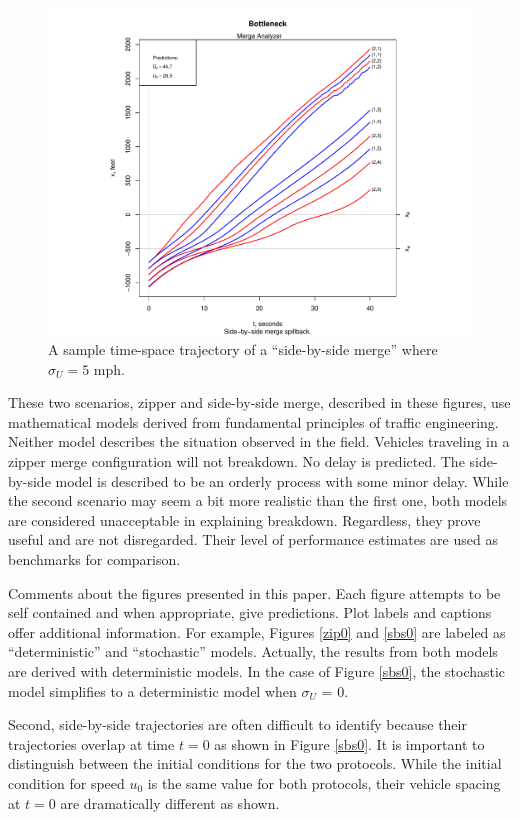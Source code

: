 \documentclass[Proceedings]{ascelike}
\begin{document}
\begin{figure}
\centering
\includegraphics[width = 5.5in]{Rplot12.pdf}
\caption{A sample time-space trajectory of a  ``side-by-side merge'' where  $\sigma_U = 5$ mph.}
\label{sbs5}
\end{figure}

These two scenarios, zipper and side-by-side merge, described in these figures, use  mathematical models derived from fundamental principles of traffic engineering. Neither model describes the situation observed in the field.  Vehicles traveling in a zipper merge configuration will not breakdown. No delay is predicted.    The side-by-side model is described to be  an orderly process with some minor delay. While the second scenario may seem a bit more realistic than the first one, both models are considered unacceptable in explaining breakdown. Regardless, they prove useful and are not disregarded. Their level of performance estimates are used as benchmarks for comparison. 

Comments about the figures presented in this paper. Each figure attempts to be self contained and when appropriate, give predictions. Plot labels and captions offer additional information. For example, Figures \ref{zip0} and \ref{sbs0} are labeled as ``deterministic'' and ``stochastic'' models. Actually, the results from both models are derived with deterministic models. In the case of Figure  \ref{sbs0}, the stochastic model simplifies to a deterministic model when $\sigma_U$ = 0.

Second, side-by-side trajectories are often difficult to identify because their trajectories overlap at time $t = 0$ as  shown in Figure  \ref{sbs0}. It is important to distinguish  between the initial conditions for the two protocols. While the initial condition for speed $u_0$ is the same value for both protocols, their vehicle spacing at $t = 0$ are dramatically different as shown.
\end{document}

